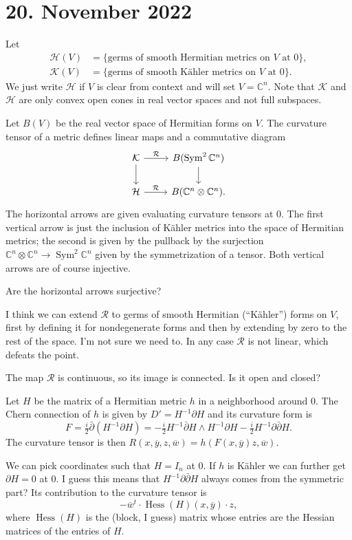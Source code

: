 \documentclass[11pt]{article}
\theoremstyle{definition}
\newcommand{\kk}[1]{\mathbb{#1}}
\newcommand{\cc}[1]{\mathcal{#1}}
\def\ov#1{\overline{#1}}
\begin{document}
\section{20. November 2022}

Let
\begin{align*}
\cc H(V)
&= \{ \text{germs of smooth Hermitian metrics on $V$ at $0$} \},
\\
\cc K(V)
&= \{ \text{germs of smooth K\"ahler metrics on $V$ at $0$} \}.
\end{align*}
We just write $\cc H$ if $V$ is clear from context and will set $V = \kk C^n$.
Note that $\cc K$ and $\cc H$ are only convex open cones in real vector spaces
and not full subspaces.

Let $B(V)$ be the real vector space of Hermitian forms on $V$.
The curvature tensor of a metric defines linear maps
and a commutative diagram
$$
\begin{tikzcd}
\cc K \ar[d] \ar[r,"\cc R"] & B(\operatorname{Sym}^2 \kk C^n)\ar[d]
\\
\cc H \ar[r, "\cc R"] & B(\kk C^n \otimes \kk C^n).
\end{tikzcd}
$$
The horizontal arrows are given evaluating curvature tensors at $0$.
The first vertical arrow is just the inclusion of K\"ahler metrics into the
space of Hermitian metrics; the second is given by the pullback by the surjection
$\kk C^n \otimes \kk C^n \to \operatorname{Sym}^2 \kk C^n$
given by the symmetrization of a tensor.
Both vertical arrows are of course injective.

Are the horizontal arrows surjective?

I think we can extend $\cc R$ to germs of smooth Hermitian (``K\"ahler'') forms
on $V$, first by defining it for nondegenerate forms and then by extending by
zero to the rest of the space. I'm not sure we need to.
In any case $\cc R$ is not linear, which defeats the point.

The map $\cc R$ is continuous, so its image is connected.
Is it open and closed?

Let $H$ be the matrix of a Hermitian metric $h$ in a neighborhood around $0$.
The Chern connection of $h$ is given by $D' = H^{-1}\partial H$ and its
curvature form is
$$
F = \tfrac i2 \bar\partial(H^{-1}\partial H)
= - \tfrac i2 H^{-1} \bar\partial H \wedge H^{-1} \partial H
- \tfrac i2 H^{-1} \partial \bar\partial H.
$$
The curvature tensor is then $R(x,\ov y, z, \ov w) = h(F(x, \ov y) z, \ov w)$.

We can pick coordinates such that $H = I_n$ at $0$.
If $h$ is K\"ahler we can further get $\partial H = 0$ at $0$.
I guess this means that $H^{-1}\partial \bar\partial H$ always comes from the
symmetric part?
Its contribution to the curvature tensor is
$$
- \ov w^t \cdot \operatorname{Hess}(H)(x, \ov y) \cdot z,
$$
where $\operatorname{Hess}(H)$ is the (block, I guess) matrix whose entries are
the Hessian matrices of the entries of $H$.
\end{document}
